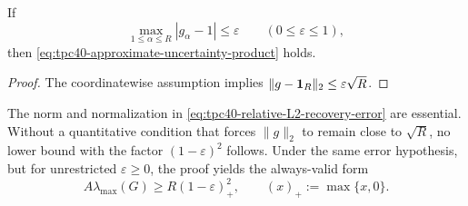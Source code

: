 \begin{corollary}
\label{cor:tpc40-coordinatewise-recovery-error}
If
\begin{equation}
 \max_{1\le\alpha\le R}|g_\alpha-1|\le\varepsilon
 \qquad(0\le\varepsilon\le1),
 \label{eq:tpc40-coordinatewise-error-assumption}
\end{equation}
then \eqref{eq:tpc40-approximate-uncertainty-product} holds.
\end{corollary}

\begin{proof}
The coordinatewise assumption implies
\(\|g-\mathbf 1_R\|_2\le\varepsilon\sqrt R\).
\end{proof}

The norm and normalization in
\eqref{eq:tpc40-relative-L2-recovery-error} are essential.  Without a
quantitative condition that forces \(\|g\|_2\) to remain close to
\(\sqrt R\), no lower bound with the factor
\((1-\varepsilon)^2\) follows.  Under the same error hypothesis, but for
unrestricted \(\varepsilon\ge0\), the proof yields the always-valid form
\begin{equation}
 A\lambda_{\max}(G)
 \ge R(1-\varepsilon)_+^2,
 \qquad (x)_+:=\max\{x,0\}.
 \label{eq:tpc40-approximate-positive-part}
\end{equation}

